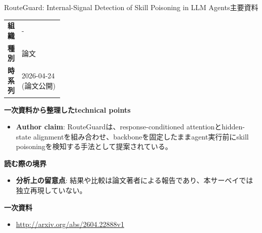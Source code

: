 \begin{technicalnote}{RouteGuard: Internal-Signal Detection of Skill Poisoning in LLM Agents}{主要資料}
\begingroup
\begin{tabularx}{\linewidth}{@{}>{\bfseries}p{0.22\linewidth}X@{}}
組織 & - \\
種別 & 論文 \\
時系列 & 2026-04-24 (論文公開) \\
\end{tabularx}
\smallskip
{\bfseries 一次資料から整理したtechnical points}
\begin{itemize}[leftmargin=1.5em,itemsep=0.35em]
\item \textbf{Author claim}: RouteGuardは、response-conditioned attentionとhidden-state alignmentを組み合わせ、backboneを固定したままagent実行前にskill poisoningを検知する手法として提案されている。
\end{itemize}
\begin{minipage}{\linewidth}
{\bfseries 読む際の境界}
\begin{itemize}[leftmargin=1.5em,itemsep=0.35em]
\item \textbf{分析上の留意点}: 結果や比較は論文著者による報告であり、本サーベイでは独立再現していない。
\end{itemize}
\begin{samepage}
{\bfseries 一次資料}
\begingroup\sloppy
\begin{itemize}[leftmargin=1.5em,itemsep=0.25em]
\item {\scriptsize\url{http://arxiv.org/abs/2604.22888v1}}
\end{itemize}
\endgroup
\end{samepage}
\end{minipage}
\endgroup
\end{technicalnote}
\medskip

